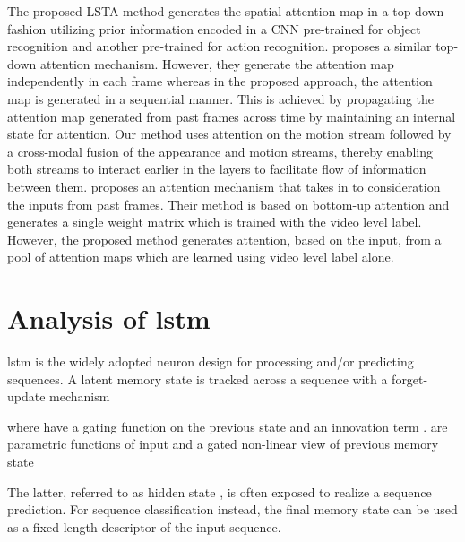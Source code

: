 \documentclass[10pt,twocolumn,letterpaper]{article}
\begin{document}
The proposed LSTA method generates the spatial attention map in a top-down fashion utilizing prior information encoded in a CNN pre-trained for object recognition and another pre-trained for action recognition.   \cite{sudhakaran2018attention} proposes a similar top-down attention mechanism. However, they generate the attention map independently in each frame whereas in the proposed approach, the attention map is generated in a sequential manner. This is achieved by propagating the attention map generated from past frames across time by maintaining an internal state for attention. Our method uses attention on the motion stream followed by a cross-modal fusion of the appearance and motion streams, thereby enabling both streams to interact earlier in the layers to facilitate flow of information between them. \cite{attention_eccv18} proposes an attention mechanism that takes in to consideration the inputs from past frames. Their method is based on bottom-up attention and generates a single weight matrix which is trained with the video level label. However, the proposed method generates attention, based on the input, from a pool of attention maps which are learned using video level label alone.






\section{Analysis of \ac{lstm}}
\label{sec:lstm}
\ac{lstm} is the widely adopted neuron design for processing and/or predicting sequences. A latent memory state  is tracked across a sequence with a forget-update mechanism

where  have a gating function on the previous state  and an innovation term .  are parametric functions of input  and a gated non-linear view of previous memory state 

The latter, referred to as hidden state , is often exposed to realize a sequence prediction. For sequence classification instead, the final memory state can be used as a fixed-length descriptor of the input sequence.
\end{document}
